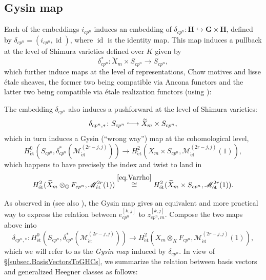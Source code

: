 \documentclass[a4paper]{amsart}
\numberwithin{equation}{section}
\theoremstyle{definition}
\newcommand{\Q}{\mathbb{Q}}
\DeclareMathOperator{\id}{id}
\DeclareMathOperator{\et}{\text{\'et}}
\DeclareMathOperator{\CHM}{CHM}
\DeclareMathOperator{\Rep}{Rep}
\DeclareMathOperator{\Anc}{Anc}
\newcommand{\boldG}{\boldsymbol{\mathrm{G}}}
\newcommand{\boldH}{\boldsymbol{\mathrm{H}}}
\newcommand{\Et}{\mathrm{\acute{E}t}}
\renewcommand{\et}{\mathrm{\acute{e}t}}
\newcommand{\longmono}{\mbox{\;$\lhook\joinrel\longrightarrow$\;}}
\begin{document}
\subsection{Gysin map}\label{subsec.GysinMap}
Each of the embeddings $i_{cp^n}$ induces an embedding of $\delta_{cp^n}\colon \mathbf{H}\hookrightarrow\mathbf{G}\times\mathbf{H}$, defined by $\delta_{cp^n}=(i_{cp^n},\id)$, where $\id$ is the identity map. This map induces a pullback at the level of Shimura varieties defined over $K$ given by \[\delta_{cp^n}^\ast\colon\widetilde{X}_m\times S_{cp^n}\longrightarrow S_{cp^n},\] which further induce maps at the level of representations, Chow motives and lisse étale sheaves, the former two being compatible via Ancona functors and the latter two being compatible via étale realization functors (using \cite[Theorem 9.7]{Torzewski}):
\begin{center}
\end{center}

The embedding $\delta_{cp^n}$ also induces a pushforward at the level of Shimura varieties: \[\delta_{cp^n,\ast}\colon S_{cp^n}\longmono \widetilde{X}_m\times S_{cp^n},\] which in turn induces a Gysin (``wrong way'') map at the cohomological level, \[H^0_{\et}\left(S_{cp^n},\delta_{cp^n}^\ast(\mathscr{M}_{\et}^{(2r-j,j)})\right)\longrightarrow H^2_{\et}\left({X}_m\times S_{cp^n},\mathscr{M}_{\et}^{(2r-j,j)}(1)\right),\]which happens to have precisely the index and twist to land in \[H^2_{\et}(\widetilde{X}_m\otimes_\Q F_{cp^n},\mathscr{M}^{2r}_{\et}(1))\stackrel{\eqref{eq.Varrho}}{\cong} H^2_{\et}(\widetilde{X}_m\times S_{cp^n},\mathscr{M}^{2r}_{\et}(1)).\]

As observed in \cite[p. 132]{JetchevLoefflerZerbes} (see also \cite[Definition 3.1.2, \S 5.2]{KingsLoefflerZerbes.MF}), the Gysin map gives an equivalent and more practical way to express the relation between $e_{cp^n}^{[k,j]}$ to $z_{cp^n,m}^{[k,j]}$. Compose the two maps above into
\begin{equation}\label{eq.Gysin}
\delta_{cp^n,\ast}\colon H^0_{\et}\left(S_{cp^n},\delta_{cp^n}^\ast(\mathscr{M}_{\et}^{(2r-j,j)})\right)\longrightarrow 
H^2_{\et}\left({X}_m\otimes_KF_{cp^n},\mathscr{M}_{\et}^{(2r-j,j)}(1)\right),
\end{equation}
which we will refer to as the \textit{Gysin map} induced by $\delta_{cp^n}$. In view of \S\ref{subsec.BasisVectorsToGHCs}, we summarize the relation between basis vectors and generalized Heegner classes as follows:
\end{document}
